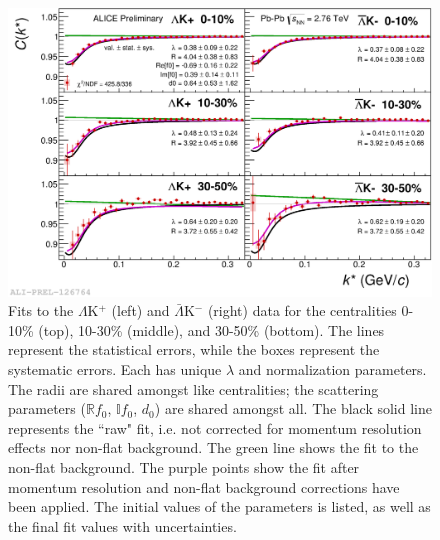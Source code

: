 \documentclass[../AnalysisNoteJBuxton.tex]{subfiles}
\begin{document}
\begin{figure}[h]
  \centering
  \includegraphics[width=\textwidth]{7_ResultsAndDiscussion/Figures/2017-Feb-04-canKStarCfwFitsLamKchPwConj_0010_1030_3050_MomResCrctn_NonFlatBgdCrctn.png}
  \caption[$\Lambda$K$^{+}$($\bar{\Lambda}$K$^{-}$) Fits]{Fits to the $\Lambda$K$^{+}$ (left) and $\bar{\Lambda}$K$^{-}$ (right) data for the centralities 0-10\% (top), 10-30\% (middle), and 30-50\% (bottom).
The lines represent the statistical errors, while the boxes represent the systematic errors.  
Each has unique $\lambda$ and normalization parameters.
The radii are shared amongst like centralities; the scattering parameters ($\mathbb{R}f_{0}$, $\mathbb{I}f_{0}$, $d_{0}$) are shared amongst all.
The black solid line represents the ``raw" fit, i.e. not corrected for momentum resolution effects nor non-flat background.  
The green line shows the fit to the non-flat background.
The purple points show the fit after momentum resolution and non-flat background corrections have been applied.
The initial values of the parameters is listed, as well as the final fit values with uncertainties.}
  \label{fig:LamKchPwConjFits}
\end{figure}
\end{document}

